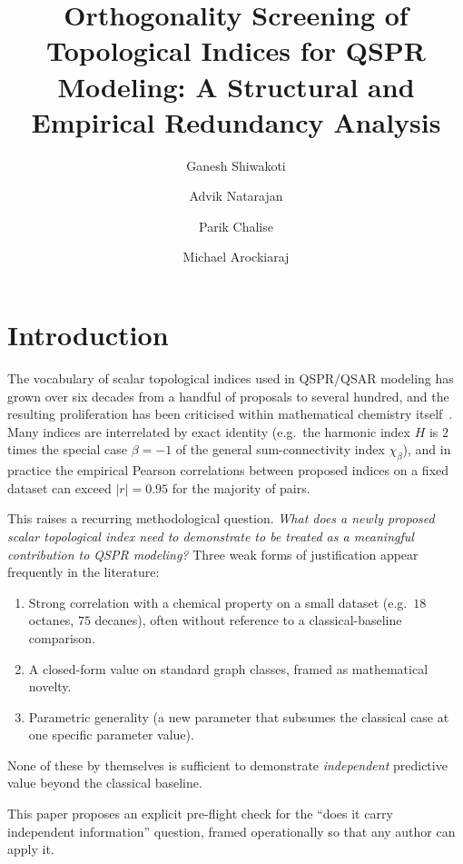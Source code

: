 \documentclass[STIX1COL]{WileyNJDv5}
\title{Orthogonality Screening of Topological Indices for QSPR Modeling: A Structural and Empirical Redundancy Analysis}
\author[1]{Ganesh Shiwakoti}
\author[2]{Advik Natarajan}
\author[3]{Parik Chalise}
\author[2]{Michael Arockiaraj}
\theoremstyle{definition}
\begin{document}
\maketitle


\section{Introduction}

The vocabulary of scalar topological indices used in QSPR/QSAR
modeling has grown over six decades from a handful of
proposals \cite{Wiener1947, Randic1975, Gutman1972} to several
hundred, and the resulting proliferation has been criticised
within mathematical chemistry itself~\cite{Gutman2013Degree}.
Many indices are interrelated by exact identity (e.g.\
the harmonic index $H$ is $2$ times the special case
$\beta=-1$ of the general sum-connectivity index $\chi_\beta$), and
in practice the empirical Pearson correlations between proposed
indices on a fixed dataset can exceed $|r|=0.95$ for the majority
of pairs.

This raises a recurring methodological question. \emph{What does a
newly proposed scalar topological index need to demonstrate to be
treated as a meaningful contribution to QSPR modeling?} Three
weak forms of justification appear frequently in the literature:
\begin{enumerate}[label=(\roman*)]
\item Strong correlation with a chemical property on a small dataset
(e.g.\ $18$ octanes, $75$ decanes), often without reference to a
classical-baseline comparison.
\item A closed-form value on standard graph classes, framed as
mathematical novelty.
\item Parametric generality (a new parameter that subsumes the
classical case at one specific parameter value).
\end{enumerate}
None of these by themselves is sufficient to demonstrate
\emph{independent} predictive value beyond the classical baseline.

This paper proposes an explicit pre-flight check for the
``does it carry independent information'' question, framed
operationally so that any author can apply it.
\end{document}
